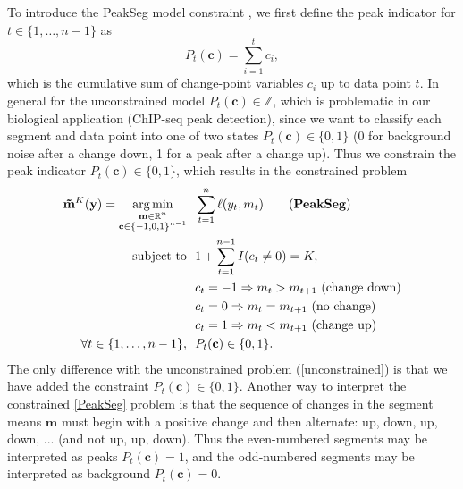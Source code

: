 \documentclass{article}
\DeclareMathOperator*{\argmin}{arg\,min}
\newcommand{\ZZ}{\mathbb Z}
\newcommand{\RR}{\mathbb R}
\begin{document}
To introduce the PeakSeg model constraint \citep{HOCKING-PeakSeg}, we first define
the peak indicator for $t\in\{1, \dots, n-1\}$ as
\begin{equation}
  \label{eq:peaks}
  P_t(\mathbf c) = \sum_{i=1}^t c_i,
\end{equation}
which is the cumulative sum of change-point variables $c_i$ up to data
point $t$. In general for the unconstrained model
$P_t(\mathbf c)\in\ZZ$, which is problematic in our biological
application (ChIP-seq peak detection), since we want to classify each
segment and data point into one of two states
$P_t(\mathbf c)\in \{0, 1\}$ (0 for background noise after a change
down, 1 for a peak after a change up).
Thus we constrain the peak indicator $P_t(\mathbf
c)\in\{0, 1\}$, which results
in the constrained problem
\begin{align}
  \label{PeakSeg}
  \mathbf{\tilde m}^K(\mathbf y) =
    \argmin_{\substack{
  \mathbf m\in\RR^{n}
\\
  \mathbf c\in\{-1,0,1\}^{n-1}
  }} &\ \ 
    \sum_{t=1}^n \ell(y_t, m_t) 
\tag{\textbf{PeakSeg}}
\\
    \text{subject to} &\ \  1+\sum_{t=1}^{n-1} I(c_t \neq 0) = K, 
\nonumber\\
& \ \ c_t = -1 \Rightarrow m_{t} > m_{t+1} \text{ (change down)}
\nonumber\\
& \ \ c_t = 0 \Rightarrow m_{t} = m_{t+1}  \text{ (no change)}
\nonumber\\
& \ \ c_t = 1 \Rightarrow m_{t} < m_{t+1} \text{ (change up)}
\nonumber\\
\forall t\in\{1, \dots, n-1\}, &\ \ P_t(\mathbf c) \in\{0, 1\}.
\nonumber
\end{align}
The only difference with the unconstrained problem
(\ref{unconstrained}) is that we have added the constraint
$P_t(\mathbf c) \in\{0, 1\}$. Another way to interpret the constrained
\ref{PeakSeg} problem is that the sequence of changes in the segment
means $\mathbf m$ must begin with a positive change and then
alternate: up, down, up, down, ... (and not up, up, down). Thus the
even-numbered segments may be interpreted as peaks $P_t(\mathbf c)=1$,
and the odd-numbered segments may be interpreted as background
$P_t(\mathbf c)=0$.
\end{document}
